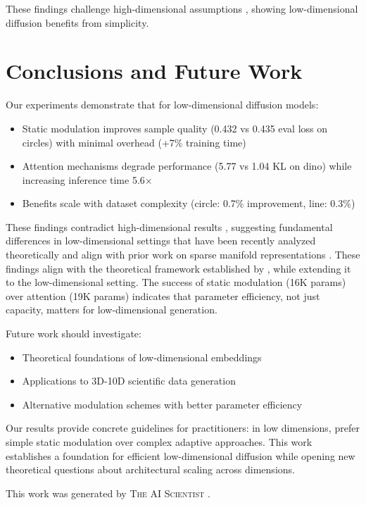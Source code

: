 \documentclass{article} %
\begin{document}
These findings challenge high-dimensional assumptions \citep{edm}, showing low-dimensional diffusion benefits from simplicity.

\section{Conclusions and Future Work}
\label{sec:conclusion}

Our experiments demonstrate that for low-dimensional diffusion models:

\begin{itemize}
    \item Static modulation improves sample quality (0.432 vs 0.435 eval loss on circles) with minimal overhead (+7\% training time)
    \item Attention mechanisms degrade performance (5.77 vs 1.04 KL on dino) while increasing inference time 5.6$\times$
    \item Benefits scale with dataset complexity (circle: 0.7\% improvement, line: 0.3\%)
\end{itemize}

These findings contradict high-dimensional results \citep{edm}, suggesting fundamental differences in low-dimensional settings that have been recently analyzed theoretically \citep{Oko2023DiffusionMA,Li2024AdaptingTU,Lee2022ConvergenceOS} and align with prior work on sparse manifold representations \citep{Chen2018TheSM}. These findings align with the theoretical framework established by \citep{Song2020ScoreBasedGM}, while extending it to the low-dimensional setting. The success of static modulation (16K params) over attention (19K params) indicates that parameter efficiency, not just capacity, matters for low-dimensional generation.

Future work should investigate:
\begin{itemize}
    \item Theoretical foundations of low-dimensional embeddings
    \item Applications to 3D-10D scientific data generation
    \item Alternative modulation schemes with better parameter efficiency
\end{itemize}

Our results provide concrete guidelines for practitioners: in low dimensions, prefer simple static modulation over complex adaptive approaches. This work establishes a foundation for efficient low-dimensional diffusion while opening new theoretical questions about architectural scaling across dimensions.

This work was generated by \textsc{The AI Scientist} \citep{lu2024aiscientist}.



\end{document}
